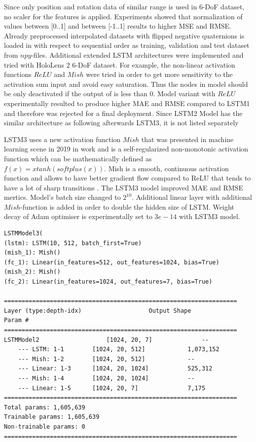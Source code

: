 Since only position and rotation data of similar range is used in 6-DoF dataset, no scaler for the features is applied.  Experiments showed that normalization of values between [0..1] and between [-1..1] results to higher MSE and RMSE. Already preprocessed interpolated datasets with flipped negative quaternions is loaded in with respect to sequential order as training, validation and test dataset from $npy$-files. Additional extended LSTM architectures were implemented and tried with HoloLens 2 6-DoF dataset. For example, the non-linear activation functions $ReLU$ and $Mish$ were tried in order to get more sensitivity to the activation sum input and avoid easy saturation. Thus the nodes in model should be only deactivated if the output of is less than 0. Model variant with $ReLU$ experimentally resulted to produce higher MAE and RMSE compared to LSTM1 and therefore was rejected for a final deployment. Since LSTM2 Model has the similar architecture as following afterwards LSTM3, it is not listed separately 

LSTM3 uses a new activation function $Mish$ that was presented in machine learning scene in 2019 in work \cite{mish} and is a self-regularized non-monotonic activation function which can be mathematically defined as $f(x)=xtanh(softplus(x))$. Mish is a smooth, continuous activation function and allows to have better gradient flow compared to ReLU that tends to have a lot of sharp transitions \cite{mish}. The LSTM3 model improved MAE and RMSE mertics. Model's batch size changed to $2^{10}$. Additional linear layer with additional $Mish$-function is added in order to double the hidden size of LSTM. Weight decay of Adam optimiser is experimentally set to $3e-14$ with LSTM3 model.
 
\begin{lstlisting}[caption={LSTM3 with Mish activation function},captionpos=b]
LSTMModel3(
(lstm): LSTM(10, 512, batch_first=True)
(mish_1): Mish()
(fc_1): Linear(in_features=512, out_features=1024, bias=True)
(mish_2): Mish()
(fc_2): Linear(in_features=1024, out_features=7, bias=True)

==================================================================
Layer (type:depth-idx)                   Output Shape              Param #
==================================================================
LSTMModel2                   [1024, 20, 7]              --
	--- LSTM: 1-1        [1024, 20, 512]            1,073,152
	--- Mish: 1-2        [1024, 20, 512]            --
	--- Linear: 1-3      [1024, 20, 1024]           525,312
	--- Mish: 1-4        [1024, 20, 1024]           --
	--- Linear: 1-5      [1024, 20, 7]              7,175
==================================================================
Total params: 1,605,639
Trainable params: 1,605,639
Non-trainable params: 0
==================================================================
\end{lstlisting}

